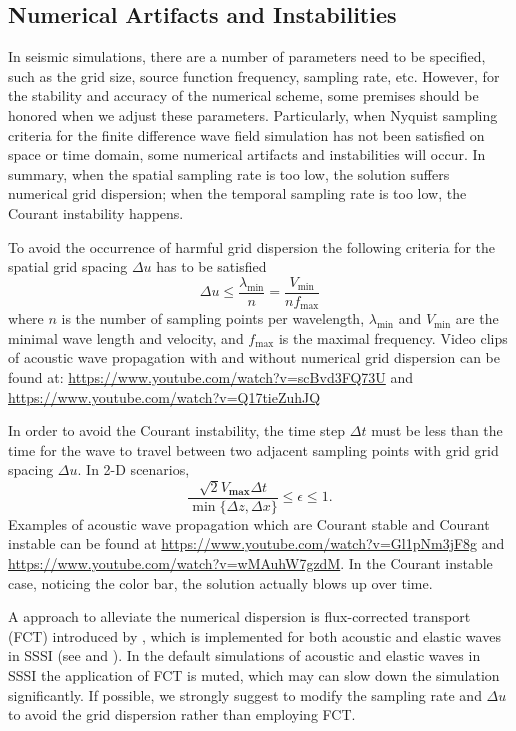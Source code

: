 \documentclass[11pt]{article}
\theoremstyle{plain}
\theoremstyle{definition}
\theoremstyle{remark}
\numberwithin{equation}{section}
\begin{document}
\subsection{Numerical Artifacts and Instabilities}
In seismic simulations, there are a number of parameters need to be specified, such as the grid size, source function frequency, sampling rate, etc. However, for the stability and accuracy of the numerical scheme, some premises should be honored when we adjust these parameters.  
Particularly, when Nyquist sampling criteria for the finite difference wave field simulation has not been satisfied on space or time domain, some numerical artifacts and instabilities will occur. In summary, when the spatial sampling rate is too low,  the solution suffers numerical grid dispersion; when the temporal sampling rate is too low, the Courant instability happens.

To avoid the occurrence of harmful grid dispersion the following criteria for the spatial grid spacing $\Delta u$ has to be satisfied
\begin{equation}
  \Delta u \leq \frac{\lambda_{\min}}{n} = \frac{V_{\min}}{nf_{\max}}
\end{equation}
where $n$ is the number of sampling points per wavelength, $\lambda_{\min}$ and $V_{\min}$ are the minimal wave length and velocity, and $f_{\max}$ is the maximal frequency. Video clips of acoustic wave propagation with and without numerical grid dispersion can be found at:
\url{https://www.youtube.com/watch?v=scBvd3FQ73U} and \url{https://www.youtube.com/watch?v=Q17tieZuhJQ}

In order to avoid the Courant instability, the time step $\Delta t$ must be less than the time for the wave to travel between two 
adjacent sampling points with grid grid spacing $\Delta u$. In 2-D scenarios,
\begin{equation}
\frac{\sqrt{2}V_{\textbf{max}}\Delta t}{\min\{\Delta z, \Delta x\}}\le \epsilon \le 1.
\end{equation}
Examples of acoustic wave propagation which are Courant stable and Courant instable can be found at
\url{https://www.youtube.com/watch?v=Gl1pNm3jF8g}  and \url{https://www.youtube.com/watch?v=wMAuhW7gzdM}. 
In the Courant instable case, noticing the color bar, the solution actually blows up over time.

A approach to alleviate the numerical dispersion is flux-corrected transport (FCT) introduced by \cite{Fei:1995aa}, 
which is implemented for both acoustic and elastic waves in SSSI (see  and ).
In the default simulations of acoustic and elastic waves in SSSI the application of FCT is muted, which may can slow down the simulation significantly. If possible, we strongly suggest to modify the sampling rate and $\Delta u$ 
to avoid the grid dispersion rather than employing FCT.  
\end{document}
